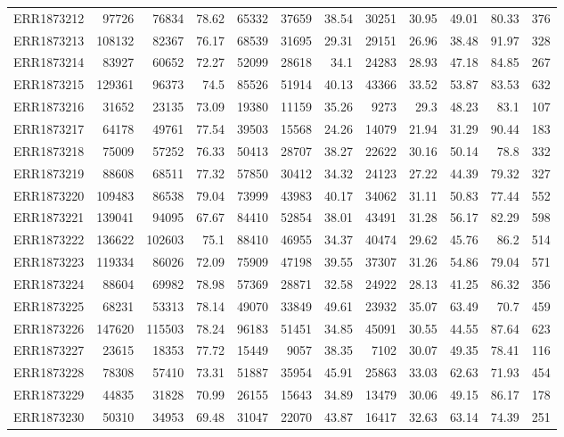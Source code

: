 \documentclass[12pt, oneside]{report}
\begin{document}
\begin{longtable}{@{}p{3.2cm}rrrrrrrrrrr@{}}
ERR1873212 & 97726 & 76834 & 78.62 & 65332 & 37659 & 38.54 & 30251 & 30.95 & 49.01 & 80.33 & 376 \\
ERR1873213 & 108132 & 82367 & 76.17 & 68539 & 31695 & 29.31 & 29151 & 26.96 & 38.48 & 91.97 & 328 \\
ERR1873214 & 83927 & 60652 & 72.27 & 52099 & 28618 & 34.1 & 24283 & 28.93 & 47.18 & 84.85 & 267 \\
ERR1873215 & 129361 & 96373 & 74.5 & 85526 & 51914 & 40.13 & 43366 & 33.52 & 53.87 & 83.53 & 632 \\
ERR1873216 & 31652 & 23135 & 73.09 & 19380 & 11159 & 35.26 & 9273 & 29.3 & 48.23 & 83.1 & 107 \\
ERR1873217 & 64178 & 49761 & 77.54 & 39503 & 15568 & 24.26 & 14079 & 21.94 & 31.29 & 90.44 & 183 \\
ERR1873218 & 75009 & 57252 & 76.33 & 50413 & 28707 & 38.27 & 22622 & 30.16 & 50.14 & 78.8 & 332 \\
ERR1873219 & 88608 & 68511 & 77.32 & 57850 & 30412 & 34.32 & 24123 & 27.22 & 44.39 & 79.32 & 327 \\
ERR1873220 & 109483 & 86538 & 79.04 & 73999 & 43983 & 40.17 & 34062 & 31.11 & 50.83 & 77.44 & 552 \\
ERR1873221 & 139041 & 94095 & 67.67 & 84410 & 52854 & 38.01 & 43491 & 31.28 & 56.17 & 82.29 & 598 \\
ERR1873222 & 136622 & 102603 & 75.1 & 88410 & 46955 & 34.37 & 40474 & 29.62 & 45.76 & 86.2 & 514 \\
ERR1873223 & 119334 & 86026 & 72.09 & 75909 & 47198 & 39.55 & 37307 & 31.26 & 54.86 & 79.04 & 571 \\
ERR1873224 & 88604 & 69982 & 78.98 & 57369 & 28871 & 32.58 & 24922 & 28.13 & 41.25 & 86.32 & 356 \\
ERR1873225 & 68231 & 53313 & 78.14 & 49070 & 33849 & 49.61 & 23932 & 35.07 & 63.49 & 70.7 & 459 \\
ERR1873226 & 147620 & 115503 & 78.24 & 96183 & 51451 & 34.85 & 45091 & 30.55 & 44.55 & 87.64 & 623 \\
ERR1873227 & 23615 & 18353 & 77.72 & 15449 & 9057 & 38.35 & 7102 & 30.07 & 49.35 & 78.41 & 116 \\
ERR1873228 & 78308 & 57410 & 73.31 & 51887 & 35954 & 45.91 & 25863 & 33.03 & 62.63 & 71.93 & 454 \\
ERR1873229 & 44835 & 31828 & 70.99 & 26155 & 15643 & 34.89 & 13479 & 30.06 & 49.15 & 86.17 & 178 \\
ERR1873230 & 50310 & 34953 & 69.48 & 31047 & 22070 & 43.87 & 16417 & 32.63 & 63.14 & 74.39 & 251 \\

\end{longtable}
\end{document}
